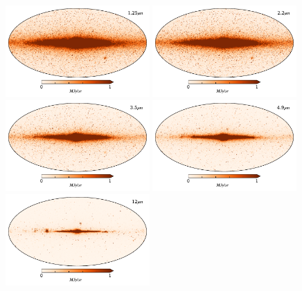 \documentclass{aa}
\begin{document}
\begin{figure}
  \centering
  \includegraphics[width=0.49\textwidth]{figs/starmaps/all_stars_mean_01.pdf}
  \includegraphics[width=0.49\textwidth]{figs/starmaps/all_stars_mean_02.pdf} \\
  \includegraphics[width=0.49\textwidth]{figs/starmaps/all_stars_mean_03.pdf}
  \includegraphics[width=0.49\textwidth]{figs/starmaps/all_stars_mean_04.pdf} \\
  \includegraphics[width=0.49\textwidth]{figs/starmaps/all_stars_mean_05.pdf}

\end{figure}
\end{document}
